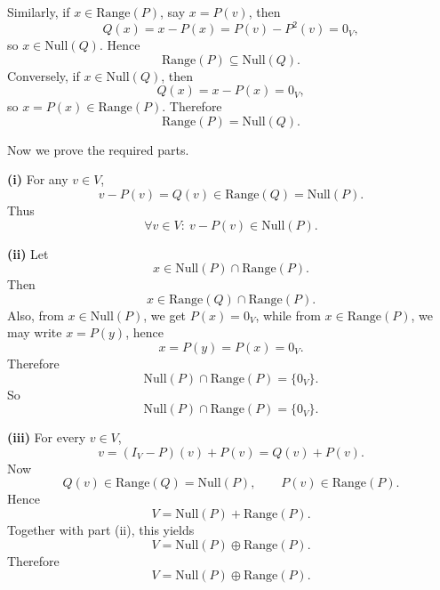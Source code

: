 \documentclass[12pt]{article}
\begin{document}
Similarly, if \(x\in \mathrm{Range}(P)\), say \(x=P(v)\), then
\[
Q(x)=x-P(x)=P(v)-P^2(v)=0_V,
\]
so \(x\in \mathrm{Null}(Q)\). Hence
\[
\mathrm{Range}(P)\subseteq \mathrm{Null}(Q).
\]
Conversely, if \(x\in \mathrm{Null}(Q)\), then
\[
Q(x)=x-P(x)=0_V,
\]
so \(x=P(x)\in \mathrm{Range}(P)\). Therefore
\[
\mathrm{Range}(P)=\mathrm{Null}(Q).
\]

Now we prove the required parts.

\noindent \textbf{(i)} For any \(v\in V\),
\[
v-P(v)=Q(v)\in \mathrm{Range}(Q)=\mathrm{Null}(P).
\]
Thus
\[
\boxed{\forall v\in V:\ v-P(v)\in \mathrm{Null}(P).}
\]

\medskip

\noindent \textbf{(ii)} Let
\[
x\in \mathrm{Null}(P)\cap \mathrm{Range}(P).
\]
Then
\[
x\in \mathrm{Range}(Q)\cap \mathrm{Range}(P).
\]
Also, from \(x\in \mathrm{Null}(P)\), we get \(P(x)=0_V\), while from \(x\in \mathrm{Range}(P)\), we may write \(x=P(y)\), hence
\[
x=P(y)=P(x)=0_V.
\]
Therefore
\[
\mathrm{Null}(P)\cap \mathrm{Range}(P)=\{0_V\}.
\]
So
\[
\boxed{\mathrm{Null}(P)\cap \mathrm{Range}(P)=\{0_V\}.}
\]

\medskip

\noindent \textbf{(iii)} For every \(v\in V\),
\[
v=(I_V-P)(v)+P(v)=Q(v)+P(v).
\]
Now
\[
Q(v)\in \mathrm{Range}(Q)=\mathrm{Null}(P),
\qquad
P(v)\in \mathrm{Range}(P).
\]
Hence
\[
V=\mathrm{Null}(P)+\mathrm{Range}(P).
\]
Together with part (ii), this yields
\[
V=\mathrm{Null}(P)\oplus \mathrm{Range}(P).
\]
Therefore
\[
\boxed{V=\mathrm{Null}(P)\oplus \mathrm{Range}(P).}
\]
\end{document}
